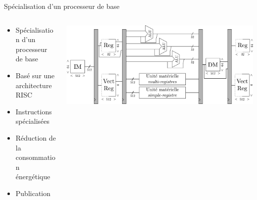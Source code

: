 \begin{frame}[c]{Spécialisation d'un processeur de base}
\renewcommand{\section}[2]{} %

  \begin{columns}
    \begin{column}{.40\textwidth}
    \vspace{-1cm}
      \begin{itemize}
        \item Spécialisation d'un processeur de base
        \item Basé sur une architecture RISC
        \item Instructions spécialisées
        \item<2-> Réduction de la consommation énergétique
        \item<2-> Publication
  
      \end{itemize}
    \end{column}
    \begin{column}[T]{.60\textwidth}
    \vspace{-0.5cm}

  \begin{minipage}[c][0cm][t]{\textwidth}

    \only<+>
    { 

      \includegraphics[width=\textwidth]{./fig/archi_tensilica}
    }
    \only<+->
    {
    \begin{table}[t]
      \centering
      {\small{}}
\end{table}}
\end{minipage}
\end{column}
\end{columns}
\end{frame}
